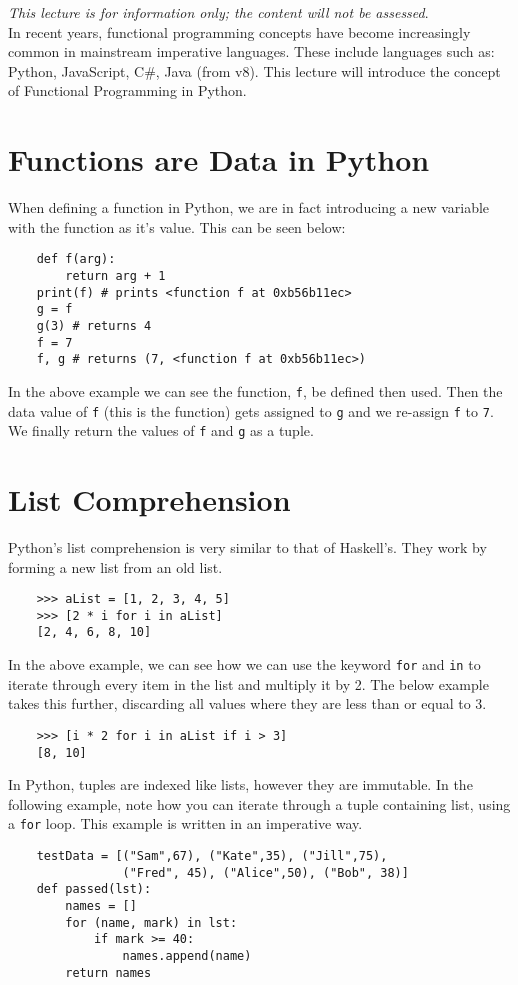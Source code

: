 
\textit{This lecture is for information only; the content will not be assessed}.\\

In recent years, functional programming concepts have become increasingly common in mainstream imperative languages. These include languages such as: Python, JavaScript, C\#, Java (from v8). This lecture will introduce the concept of Functional Programming in Python. 

\section{Functions are Data in Python}
When defining a function in Python, we are in fact introducing a new variable with the function as it's value. This can be seen below:
\begin{verbatim}
    def f(arg):
        return arg + 1
    print(f) # prints <function f at 0xb56b11ec>
    g = f
    g(3) # returns 4
    f = 7
    f, g # returns (7, <function f at 0xb56b11ec>)
\end{verbatim}
In the above example we can see the function, \verb|f|, be defined then used. Then the data value of \verb|f| (this is the function) gets assigned to \verb|g| and we re-assign \verb|f| to \verb|7|. We finally return the values of \verb|f| and \verb|g| as a tuple.

\section{List Comprehension}
Python's list comprehension is very similar to that of Haskell's. They work by forming a new list from an old list. 
\begin{verbatim}
    >>> aList = [1, 2, 3, 4, 5]
    >>> [2 * i for i in aList]
    [2, 4, 6, 8, 10]
\end{verbatim}
In the above example, we can see how we can use the keyword \verb|for| and \verb|in| to iterate through every item in the list and multiply it by 2. The below example takes this further, discarding all values where they are less than or equal to 3.
\begin{verbatim}
    >>> [i * 2 for i in aList if i > 3]
    [8, 10]
\end{verbatim}

In Python, tuples are indexed like lists, however they are immutable. In the following example, note how you can iterate through a tuple containing list, using a \verb|for| loop. This example is written in an imperative way.
\begin{verbatim}
    testData = [("Sam",67), ("Kate",35), ("Jill",75),
                ("Fred", 45), ("Alice",50), ("Bob", 38)]
    def passed(lst):
        names = []
        for (name, mark) in lst:
            if mark >= 40:
                names.append(name)
        return names 
\end{verbatim}

